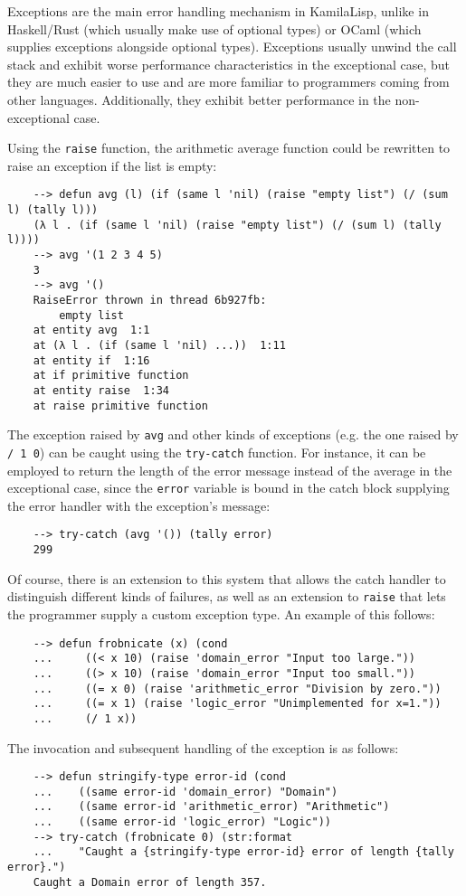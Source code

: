 Exceptions are the main error handling mechanism in KamilaLisp, unlike in Haskell/Rust (which usually make use of optional types) or OCaml (which supplies exceptions alongside optional types). Exceptions usually unwind the call stack and exhibit worse performance characteristics in the exceptional case, but they are much easier to use and are more familiar to programmers coming from other languages. Additionally, they exhibit better performance in the non-exceptional case.

Using the \verb|raise| function, the arithmetic average function could be rewritten to raise an exception if the list is empty:

\begin{Verbatim}
    --> defun avg (l) (if (same l 'nil) (raise "empty list") (/ (sum l) (tally l)))
    (λ l . (if (same l 'nil) (raise "empty list") (/ (sum l) (tally l))))
    --> avg '(1 2 3 4 5)
    3
    --> avg '()
    RaiseError thrown in thread 6b927fb:
        empty list
    at entity avg  1:1
    at (λ l . (if (same l 'nil) ...))  1:11
    at entity if  1:16
    at if primitive function
    at entity raise  1:34
    at raise primitive function
\end{Verbatim}

The exception raised by \verb|avg| and other kinds of exceptions (e.g. the one raised by \verb|/ 1 0|) can be caught using the \verb|try-catch| function. For instance, it can be employed to return the length of the error message instead of the average in the exceptional case, since the \verb|error| variable is bound in the catch block supplying the error handler with the exception's message:

\begin{Verbatim}
    --> try-catch (avg '()) (tally error)
    299
\end{Verbatim}

Of course, there is an extension to this system that allows the catch handler to distinguish different kinds of failures, as well as an extension to \verb|raise| that lets the programmer supply a custom exception type. An example of this follows:

\begin{Verbatim}
    --> defun frobnicate (x) (cond
    ...     ((< x 10) (raise 'domain_error "Input too large."))
    ...     ((> x 10) (raise 'domain_error "Input too small."))
    ...     ((= x 0) (raise 'arithmetic_error "Division by zero."))
    ...     ((= x 1) (raise 'logic_error "Unimplemented for x=1."))
    ...     (/ 1 x))
\end{Verbatim}

The invocation and subsequent handling of the exception is as follows:

\begin{Verbatim}
    --> defun stringify-type error-id (cond
    ...    ((same error-id 'domain_error) "Domain")
    ...    ((same error-id 'arithmetic_error) "Arithmetic")
    ...    ((same error-id 'logic_error) "Logic"))
    --> try-catch (frobnicate 0) (str:format
    ...    "Caught a {stringify-type error-id} error of length {tally error}.")
    Caught a Domain error of length 357.
\end{Verbatim}

